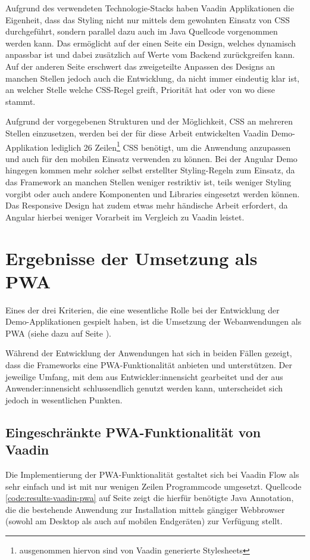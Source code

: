 \documentclass[a4paper,12pt,twoside]{scrreprt}
\begin{document}
Aufgrund des verwendeten Technologie-Stacks haben Vaadin Applikationen die Eigenheit, dass das Styling nicht nur mittels dem gewohnten Einsatz von \ac{CSS} durchgeführt, sondern parallel dazu auch im Java Quellcode vorgenommen werden kann. Das ermöglicht auf der einen Seite ein Design, welches dynamisch anpassbar ist und dabei zusätzlich auf Werte vom Backend zurückgreifen kann. Auf der anderen Seite erschwert das zweigeteilte Anpassen des Designs an manchen Stellen jedoch auch die Entwicklung, da nicht immer eindeutig klar ist, an welcher Stelle welche \ac{CSS}-Regel greift, Priorität hat oder von wo diese stammt.

\medskip

Aufgrund der vorgegebenen Strukturen und der Möglichkeit, \ac{CSS} an mehreren Stellen einzusetzen, werden bei der für diese Arbeit entwickelten Vaadin Demo-Applikation lediglich 26 Zeilen\footnote{ausgenommen hiervon sind von Vaadin generierte Stylesheets} \ac{CSS} benötigt, um die Anwendung anzupassen und auch für den mobilen Einsatz verwenden zu können. Bei der Angular Demo hingegen kommen mehr solcher selbst erstellter Styling-Regeln zum Einsatz, da das Framework an manchen Stellen weniger restriktiv ist, teils weniger Styling vorgibt oder auch andere Komponenten und Libraries eingesetzt werden können. Das Responsive Design hat zudem etwas mehr händische Arbeit erfordert, da Angular hierbei weniger Vorarbeit im Vergleich zu Vaadin leistet.

\section{Ergebnisse der Umsetzung als \acs{PWA}}
\label{sec:ergebnisse-umsetzung-pwa}
Eines der drei Kriterien, die eine wesentliche Rolle bei der Entwicklung der Demo-Applikationen gespielt haben, ist die Umsetzung der Webanwendungen als \ac{PWA} (siehe dazu \textit{} auf Seite \pageref{sub-sec:kriterien-pwa}).

Während der Entwicklung der Anwendungen hat sich in beiden Fällen gezeigt, dass die Frameworks eine \ac{PWA}-Funktionalität anbieten und unterstützen. Der jeweilige Umfang, mit dem aus Entwickler:innensicht gearbeitet und der aus Anwender:innensicht schlussendlich genutzt werden kann, unterscheidet sich jedoch in wesentlichen Punkten.

\subsection{Eingeschränkte \acs{PWA}-Funktionalität von Vaadin}
\label{sub-sec:results-pwa-vaadin}
Die Implementierung der \ac{PWA}-Funktionalität gestaltet sich bei Vaadin Flow als sehr einfach und ist mit nur wenigen Zeilen Programmcode umgesetzt. Quellcode \ref{code:results-vaadin-pwa} auf Seite \pageref{code:results-vaadin-pwa} zeigt die hierfür benötigte Java Annotation, die die bestehende Anwendung zur Installation mittels gängiger Webbrowser (sowohl am Desktop als auch auf mobilen Endgeräten) zur Verfügung stellt.
\end{document}
